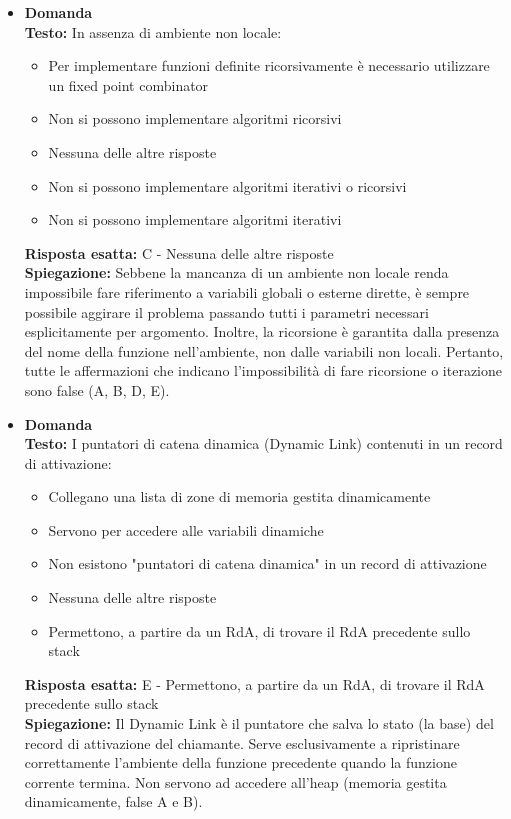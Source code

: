 \documentclass[12pt, a4paper]{article}
\newcounter{domandateoria}
\begin{document}
\begin{itemize}
    \item {}\textbf{Domanda \thedomandateoria} \\
    \textbf{Testo:} In assenza di ambiente non locale:
    \begin{itemize}
        \item[A)] Per implementare funzioni definite ricorsivamente è necessario utilizzare un fixed point combinator
        \item[B)] Non si possono implementare algoritmi ricorsivi
        \item[C)] Nessuna delle altre risposte
        \item[D)] Non si possono implementare algoritmi iterativi o ricorsivi
        \item[E)] Non si possono implementare algoritmi iterativi
    \end{itemize}
    \textbf{Risposta esatta:} C - Nessuna delle altre risposte \\
    \textbf{Spiegazione:} Sebbene la mancanza di un ambiente non locale renda impossibile fare riferimento a variabili globali o esterne dirette, è sempre possibile aggirare il problema passando tutti i parametri necessari esplicitamente per argomento. Inoltre, la ricorsione è garantita dalla presenza del nome della funzione nell'ambiente, non dalle variabili non locali. Pertanto, tutte le affermazioni che indicano l'impossibilità di fare ricorsione o iterazione sono false (A, B, D, E).
    \vspace{0.3cm}

    \item {}\textbf{Domanda \thedomandateoria} \\
    \textbf{Testo:} I puntatori di catena dinamica (Dynamic Link) contenuti in un record di attivazione:
    \begin{itemize}
        \item[A)] Collegano una lista di zone di memoria gestita dinamicamente
        \item[B)] Servono per accedere alle variabili dinamiche
        \item[C)] Non esistono "puntatori di catena dinamica" in un record di attivazione
        \item[D)] Nessuna delle altre risposte
        \item[E)] Permettono, a partire da un RdA, di trovare il RdA precedente sullo stack
    \end{itemize}
    \textbf{Risposta esatta:} E - Permettono, a partire da un RdA, di trovare il RdA precedente sullo stack \\
    \textbf{Spiegazione:} Il Dynamic Link è il puntatore che salva lo stato (la base) del record di attivazione del chiamante. Serve esclusivamente a ripristinare correttamente l'ambiente della funzione precedente quando la funzione corrente termina. Non servono ad accedere all'heap (memoria gestita dinamicamente, false A e B).
    \vspace{0.3cm}


\end{itemize}
\end{document}
